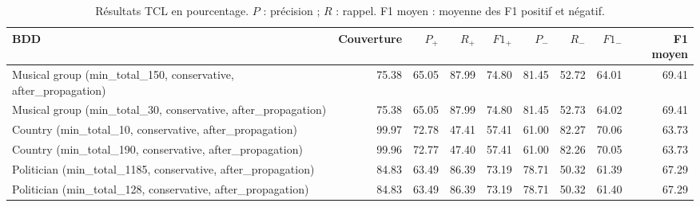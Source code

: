\begin{table}[htbp]
\centering
\small
\setlength{\tabcolsep}{3pt}
\begin{tabular}{lrrrrrrrr}
\hline
BDD & Couverture & $P_+$ & $R_+$ & $F1_+$ & $P_-$ & $R_-$ & $F1_-$ & F1 moyen \\
\hline
Musical group (min\_total\_150, conservative, after\_propagation) & 75.38 & 65.05 & 87.99 & 74.80 & 81.45 & 52.72 & 64.01 & 69.41 \\
Musical group (min\_total\_30, conservative, after\_propagation) & 75.38 & 65.05 & 87.99 & 74.80 & 81.45 & 52.73 & 64.02 & 69.41 \\
Country (min\_total\_10, conservative, after\_propagation) & 99.97 & 72.78 & 47.41 & 57.41 & 61.00 & 82.27 & 70.06 & 63.73 \\
Country (min\_total\_190, conservative, after\_propagation) & 99.96 & 72.77 & 47.40 & 57.41 & 61.00 & 82.26 & 70.05 & 63.73 \\
Politician (min\_total\_1185, conservative, after\_propagation) & 84.83 & 63.49 & 86.39 & 73.19 & 78.71 & 50.32 & 61.39 & 67.29 \\
Politician (min\_total\_128, conservative, after\_propagation) & 84.83 & 63.49 & 86.39 & 73.19 & 78.71 & 50.32 & 61.40 & 67.29 \\
\hline
\end{tabular}
\caption{Résultats TCL en pourcentage. $P$ : précision ; $R$ : rappel. F1 moyen : moyenne des F1 positif et négatif.}
\label{tab:fact-checking-tcl}
\end{table}
